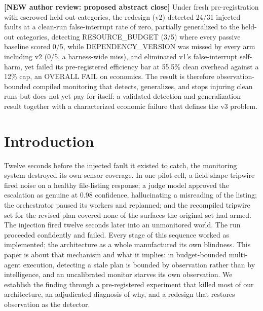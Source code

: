 \documentclass[acmsmall,screen,review,anonymous]{acmart}
\renewenvironment{leftbar}{%
  \def\FrameCommand{\hspace{2pt}{\color{lbcol}\vrule width 1.5pt}\hspace{8pt}}%
  \MakeFramed{\advance\hsize-\width \FrameRestore}\small}%
  {\endMakeFramed}
\begin{document}

\maketitle

\begin{leftbar}
\textbf{[NEW \textperiodcentered{} author review: proposed abstract close]} Under fresh pre-registration with escrowed held-out categories, the redesign (v2) detected 24/31 injected faults at a clean-run false-interrupt rate of zero, partially generalized to the held-out categories, detecting RESOURCE\_BUDGET (3/5) where every passive baseline scored 0/5, while DEPENDENCY\_VERSION was missed by every arm including v2 (0/5, a harness-wide miss), and eliminated v1's false-interrupt self-harm, yet failed its pre-registered efficiency bar at 55.5\% clean overhead against a 12\% cap, an OVERALL FAIL on economics. The result is therefore observation-bounded compiled monitoring that detects, generalizes, and stops injuring clean runs but does not yet pay for itself: a validated detection-and-generalization result together with a characterized economic failure that defines the v3 problem.

\end{leftbar}

\section{Introduction}
Twelve seconds before the injected fault it existed to catch, the monitoring system destroyed its own sensor coverage. In one pilot cell, a field-shape tripwire fired noise on a healthy file-listing response; a judge model approved the escalation as genuine at 0.98 confidence, hallucinating a misreading of the listing; the orchestrator paused its workers and replanned; and the recompiled tripwire set for the revised plan covered none of the surfaces the original set had armed. The injection fired twelve seconds later into an unmonitored world. The run proceeded confidently and failed. Every stage of this sequence worked as implemented; the architecture as a whole manufactured its own blindness. This paper is about that mechanism and what it implies: in budget-bounded multi-agent execution, detecting a stale plan is bounded by observation rather than by intelligence, and an uncalibrated monitor starves its own observation. We establish the finding through a pre-registered experiment that killed most of our architecture, an adjudicated diagnosis of why, and a redesign that restores observation as the detector.
\end{document}
